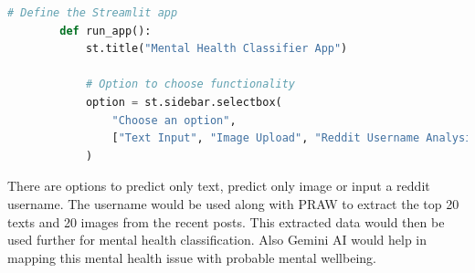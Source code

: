 \begin{tcolorbox}[colback=gray!5!white, colframe=gray!80!black, boxrule=0.5pt, title=Main Streamlit Application Logic]
    \begin{lstlisting}[language=Python]
        # Define the Streamlit app
        def run_app():
            st.title("Mental Health Classifier App")
        
            # Option to choose functionality
            option = st.sidebar.selectbox(
                "Choose an option",
                ["Text Input", "Image Upload", "Reddit Username Analysis"]
            )
        \end{lstlisting}
    \end{tcolorbox}
    \noindent
    There are options to predict only text, predict only image or input a reddit username. The username would be used along with PRAW to extract the top 20 texts and 20 images from the recent posts. This extracted data would then be used further for mental health classification. Also Gemini AI would help in mapping this mental health issue with probable mental wellbeing.

